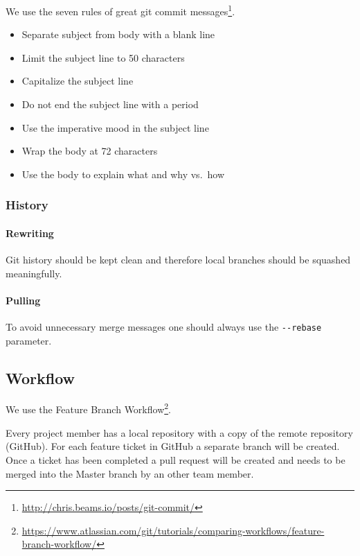 We use the seven rules of great git commit
messages\footnote{\url{http://chris.beams.io/posts/git-commit/}}.

\begin{itemize}
\item
  Separate subject from body with a blank line
\item
  Limit the subject line to 50 characters
\item
  Capitalize the subject line
\item
  Do not end the subject line with a period
\item
  Use the imperative mood in the subject line
\item
  Wrap the body at 72 characters
\item
  Use the body to explain what and why vs.~how
\end{itemize}

\subsubsection{History}\label{history}

\paragraph{Rewriting}\label{rewriting}

Git history should be kept clean and therefore local branches should be
squashed meaningfully.

\paragraph{Pulling}\label{pulling}

To avoid unnecessary merge messages one should always use the
\texttt{-\/-rebase} parameter.

\subsection{Workflow}\label{workflow}

We use the Feature Branch
Workflow\footnote{\url{https://www.atlassian.com/git/tutorials/comparing-workflows/feature-branch-workflow/}}.

Every project member has a local repository with a copy of the remote
repository (GitHub). For each feature ticket in GitHub a separate branch
will be created. Once a ticket has been completed a pull request will be
created and needs to be merged into the Master branch by an other team
member.

